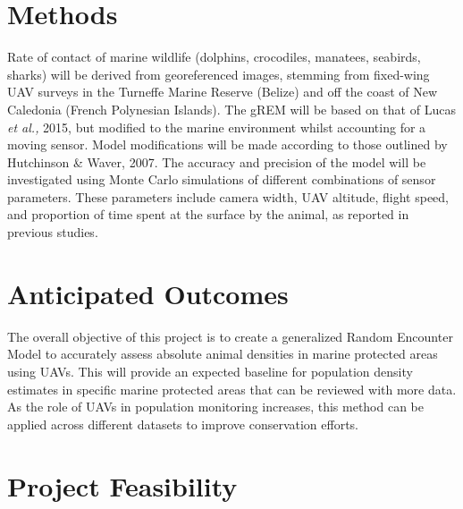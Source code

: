 \documentclass[11pt]{article}
\begin{document}
\section{Methods}
Rate of contact of marine wildlife (dolphins, crocodiles, manatees, seabirds, sharks) will be derived from georeferenced images, stemming from fixed-wing UAV surveys in the Turneffe Marine Reserve (Belize) and off the coast of New Caledonia (French Polynesian Islands). The gREM will be based on that of Lucas \textit{et al.,} 2015, but modified to the marine environment whilst accounting for a moving sensor. Model modifications will be made according to those outlined by Hutchinson \& Waver, 2007. The accuracy and precision of the model will be investigated using Monte Carlo simulations of different combinations of sensor parameters. These parameters include camera width, UAV altitude, flight speed, and proportion of time spent at the surface by the animal, as reported in previous studies. 



\section{Anticipated Outcomes}
The overall objective of this project is to create a generalized Random Encounter Model to accurately assess absolute animal densities in marine protected areas using UAVs. This will provide an expected baseline for population density estimates in specific marine protected areas that can be reviewed with more data. As the role of UAVs in population monitoring increases, this method can be applied across different datasets to improve conservation efforts.


\section{Project Feasibility}
\end{document}
